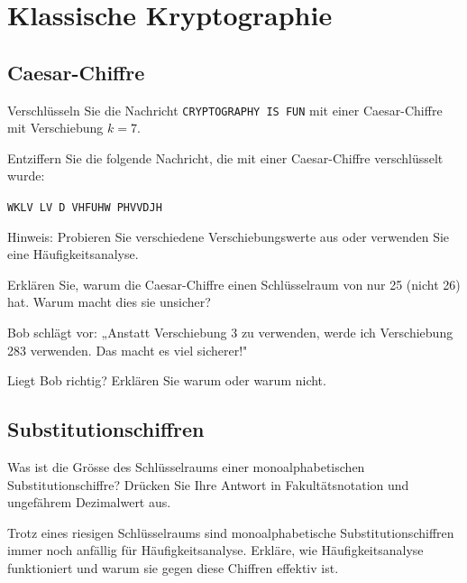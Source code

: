 \documentclass[11pt,a4paper]{report}
\begin{document}
\section{Klassische Kryptographie}

\subsection{Caesar-Chiffre}

\begin{ex}
Verschlüsseln Sie die Nachricht \texttt{CRYPTOGRAPHY IS FUN} mit einer Caesar-Chiffre mit Verschiebung $k = 7$.
\end{ex}

\begin{ex}
Entziffern Sie die folgende Nachricht, die mit einer Caesar-Chiffre verschlüsselt wurde:

\texttt{WKLV LV D VHFUHW PHVVDJH}

Hinweis: Probieren Sie verschiedene Verschiebungswerte aus oder verwenden Sie eine Häufigkeitsanalyse.
\end{ex}

\begin{ex}
Erklären Sie, warum die Caesar-Chiffre einen Schlüsselraum von nur 25 (nicht 26) hat. Warum macht dies sie unsicher?
\end{ex}

\begin{ex}
Bob schlägt vor: „Anstatt Verschiebung 3 zu verwenden, werde ich Verschiebung 283 verwenden. Das macht es viel sicherer!"

Liegt Bob richtig? Erklären Sie warum oder warum nicht.
\end{ex}

\subsection{Substitutionschiffren}

\begin{ex}
Was ist die Grösse des Schlüsselraums einer monoalphabetischen Substitutionschiffre? Drücken Sie Ihre Antwort in Fakultätsnotation und ungefährem Dezimalwert aus.
\end{ex}

\begin{ex}
Trotz eines riesigen Schlüsselraums sind monoalphabetische Substitutionschiffren immer noch anfällig für Häufigkeitsanalyse. Erkläre, wie Häufigkeitsanalyse funktioniert und warum sie gegen diese Chiffren effektiv ist.
\end{ex}
\end{document}
